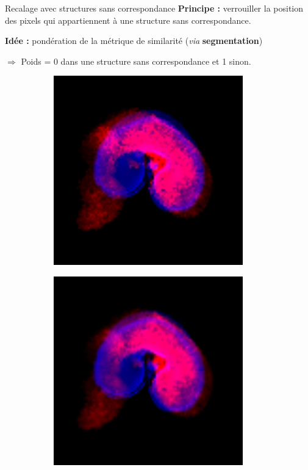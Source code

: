 \documentclass[10pt]{beamer}
\begin{document}
\begin{frame}{Recalage avec structures sans correspondance}
  \textbf{Principe :} verrouiller la position des pixels qui appartiennent à une structure sans correspondance.

  \textbf{Idée :} pondération de la métrique de similarité (\textit{via }\textbf{segmentation})
  
  $\Rightarrow$ Poids = 0 dans une structure sans correspondance et 1 sinon.

  \begin{figure}[ht]
    \centering
    \begin{subfigure}[t]{0.33\textwidth}
      \centering
      \includegraphics[width=0.9\textwidth]{fig/slice_overlay_affine}
      \caption{}
      \label{subfig:slice_overlay_affine}
    \end{subfigure}%
    \begin{subfigure}[t]{0.33\textwidth}
      \centering
      \includegraphics[width=0.9\textwidth]{fig/slice_overlay_0weight}

\end{subfigure}
\end{figure}
\end{frame}
\end{document}

